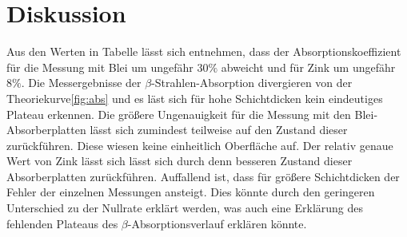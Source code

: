 \section{Diskussion}
\label{sec:Diskussion}
Aus den Werten in Tabelle lässt sich entnehmen, dass der Absorptionskoeffizient für die Messung mit Blei um ungefähr $30\%$ abweicht und für Zink um ungefähr $8\%$.
Die Messergebnisse der $\beta$-Strahlen-Absorption divergieren von der Theoriekurve\ref{fig:abs} und es läst sich für hohe Schichtdicken kein eindeutiges Plateau erkennen.
Die größere Ungenauigkeit für die Messung mit den Blei-Absorberplatten lässt sich zumindest teilweise auf den Zustand dieser zurückführen.
Diese wiesen keine einheitlich Oberfläche auf.
Der relativ genaue Wert von Zink lässt sich lässt sich durch denn besseren Zustand dieser Absorberplatten zurückführen.
Auffallend ist, dass für größere Schichtdicken der Fehler der einzelnen Messungen ansteigt.
Dies könnte durch den geringeren Unterschied zu der Nullrate erklärt werden, was auch eine Erklärung des fehlenden Plateaus des $\beta$-Absorptionsverlauf erklären könnte.
